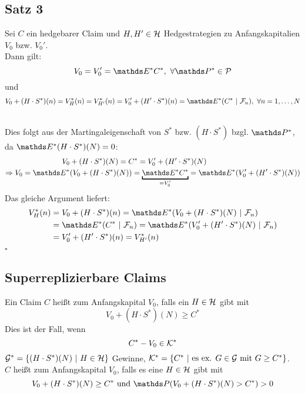 \subsection{Satz 3}
\label{sub:satz_3}
Sei $C$ ein hedgebarer Claim und $H,H'\in \mathcal{H}$ Hedgestrategien zu Anfangskapitalien $V_0$ bzw. $V_0'$.\\
Dann gilt:
\[
V_0=V_0'=\E^*C^*,~\forall \Pw^*\in\mc{P}
\]
und
\[
V_0+(H\cdot S^*)(n)=V_H^*(n)=V_{H'}^*(n)=V_0'+(H'\cdot S^*)(n)=\E^*(C^*~|~\F_n),~\forall n=1,\dots,N
\]

\\
Dies folgt aus der Martingaleigenschaft von $S^*$ bzw. $(H\cdot S^*)$ bzgl. $\Pw^*$, da $\E^*(H\cdot S^*)(N)=0$:
\begin{equation*}
\begin{aligned}
	V_0&+(H\cdot S^*)(N)=C^*=V_0'+(H'\cdot S^*)(N)\\
	\Rightarrow V_0=\E^*&(V_0+(H\cdot S^*)(N))=\underbracket{\E^*C^*}_{=V_0'}=\E^*(V_0'+(H'\cdot S^*)(N))
\end{aligned}
\end{equation*} 
Das gleiche Argument liefert:
\begin{equation*}
\begin{aligned}
	V_H^*(n) &= V_0+(H\cdot S^*)(n)=\E^*(V_0+(H\cdot S^*)(N)~|~\F_n)\\
	&= \E^*(C^*~|~\F_n)=\E^*(V_0'+(H'\cdot S^*)(N)~|~\F_n)\\
	&= V_0'+(H'\cdot S^*)(n)= V_{H'}^*(n)
\end{aligned}
\end{equation*}
\hfill $\square$

\subsection{Superreplizierbare Claims}
\label{sub:superrepl_claims}
Ein Claim $C$ heißt  zum Anfangskapital $V_0$, falls ein $H\in\mathcal{H}$ gibt mit
\[
V_0+(H\cdot S^*)(N)\ge C^*
\]
Dies ist der Fall, wenn
\[
C^*-V_0\in \mathcal{K}^*
\]
$\mathcal{G}^*=\{(H\cdot S^*)(N)~|~H\in\mathcal{H}\}$ Gewinne, $\mathcal{K}^*=\{C^*~|~\text{es ex. }G\in\mathcal{G}\text{ mit }G\ge C^* \}$.\\
$C$ heißt  zum Anfangskapital $V_0$, falls es eine $H\in \mathcal{H}$ gibt mit
\[
V_0+(H\cdot S^*)(N)\ge C^*\text{ und }\Pw(V_0+(H\cdot S^*)(N)>C^*)>0
\]

